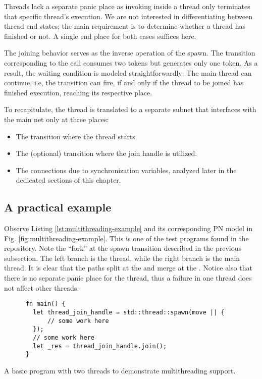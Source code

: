 Threads lack a separate panic place
as invoking  inside a thread
only terminates that specific thread's execution.
We are not interested in differentiating between thread end states;
the main requirement is to determine whether a thread has finished or not.
A single end place for both cases suffices here.

The joining behavior serves as the inverse operation of the spawn.
The transition corresponding to the  call consumes two tokens
but generates only one token.
As a result, the waiting condition is modeled straightforwardly:
The main thread can continue, i.e, the  transition can fire,
if and only if the thread to be joined has finished execution,
reaching its respective  place.

To recapitulate, the thread is translated to a separate subnet
that interfaces with the main net only at three places:

\begin{itemize}
      \item The  transition where the thread starts.
      \item The (optional)  transition where the join handle is utilized.
      \item The connections due to synchronization variables,
            analyzed later in the dedicated sections of this chapter.
\end{itemize}

\subsection{A practical example}

Observe Listing \ref{lst:multithreading-example}
and its corresponding \acrshort{PN} model in Fig. \ref{fig:multithreading-example}.
This is one of the test programs found in the repository.
Note the ``fork'' at the spawn transition described in the previous subsection.
The left branch is the thread, while the right branch is the main thread.
It is clear that the paths split at the  and merge
at the .
Notice also that there is no separate panic place for the thread,
thus a failure in one thread does not affect other threads.

\begin{listing}[!htb]
      \begin{verbatim}
      fn main() {
        let thread_join_handle = std::thread::spawn(move || {
            // some work here
        });
        // some work here
        let _res = thread_join_handle.join();
      }  
      \end{verbatim}
      \caption{A basic program with two threads to demonstrate multithreading support.}
      \label{lst:multithreading-example}
\end{listing}

